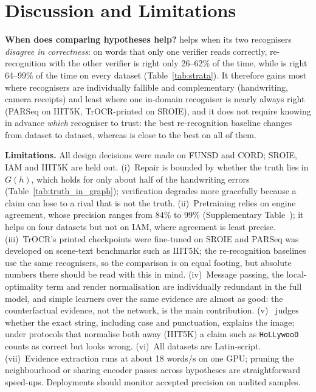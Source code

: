 \section{Discussion and Limitations}
\label{sec:discussion}
\textbf{When does comparing hypotheses help?} \ours{} helps when its two recognisers \emph{disagree in correctness}: on
words that only one verifier reads correctly, re-recognition with the other verifier is right only 26--62\% of the time,
while \ours{} is right 64--99\% of the time on every dataset (Table~\ref{tab:strata}). It therefore gains most where
recognisers are individually fallible and complementary (handwriting, camera receipts) and least where one in-domain
recogniser is nearly always right (PARSeq on IIIT5K, TrOCR-printed on SROIE), and it does not require knowing in
advance \emph{which} recogniser to trust: the best re-recognition baseline changes from dataset to dataset, whereas
\ours{} is close to the best on all of them.

\textbf{Limitations.} All design decisions were made on FUNSD and CORD; SROIE, IAM and IIIT5K are held out. (i)~Repair is bounded by whether the truth lies in $G(h)$, which holds for only about half of the
handwriting errors (Table~\ref{tab:truth_in_graph}); verification degrades more gracefully because a claim can lose to a
rival that is not the truth. (ii)~Pretraining relies on engine agreement, whose precision ranges from 84\% to 99\%
(Supplementary Table~); it helps on four datasets but not on IAM, where agreement is least precise.
(iii)~TrOCR's printed checkpoints were fine-tuned on SROIE and PARSeq was developed on scene-text benchmarks such as
IIIT5K; the re-recognition baselines use the same recognisers, so the comparison is on equal footing, but absolute
numbers there should be read with this in mind. (iv)~Message passing, the local-optimality term and render
normalisation are individually redundant in the full model, and simple learners over the same evidence are almost as
good: the counterfactual evidence, not the network, is the main contribution. (v)~\ours{} judges whether the exact
string, including case and punctuation, explains the image; under protocols that normalise both away (IIIT5K) a claim
such as \texttt{HoLLywooD} counts as correct but looks wrong. (vi)~All datasets are Latin-script. (vii)~Evidence
extraction runs at about 18 words/s on one GPU; pruning the neighbourhood or sharing encoder passes across hypotheses
are straightforward speed-ups. Deployments should monitor accepted precision on audited samples.

